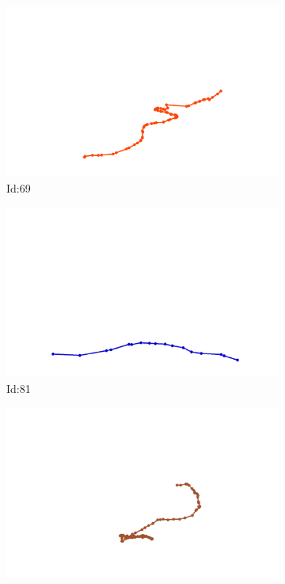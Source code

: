 \documentclass[12pt,twoside]{report}
\begin{document}
\begin{figure}
\centering
\begin{subfigure}[b]{0.20\textwidth}
\centering
\includegraphics[width=\textwidth]{../trajectories/69.png}
\caption{Id:69}
\end{subfigure}
\begin{subfigure}[b]{0.20\textwidth}
\centering
\includegraphics[width=\textwidth]{../trajectories/81.png}
\caption{Id:81}
\end{subfigure}
\begin{subfigure}[b]{0.20\textwidth}
\centering
\includegraphics[width=\textwidth]{../trajectories/107.png}

\end{subfigure}
\end{figure}
\end{document}
